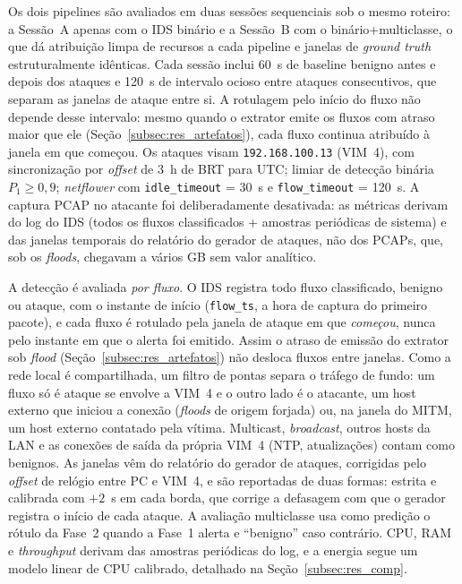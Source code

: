 \documentclass[12pt]{article}
\begin{document}
Os dois pipelines são avaliados em duas sessões
sequenciais sob o mesmo roteiro: a Sessão~A apenas com o IDS binário e a Sessão~B
com o binário+multiclasse, o que dá atribuição limpa de recursos a cada pipeline
e janelas de \textit{ground truth} estruturalmente idênticas. Cada sessão inclui
60~s de baseline benigno antes e depois dos ataques e 120~s de intervalo
ocioso entre ataques consecutivos, que separam as janelas de ataque entre si.
A rotulagem pelo início do fluxo não depende desse intervalo: mesmo quando o
extrator emite os fluxos com atraso maior que ele (Seção~\ref{subsec:res_artefatos}),
cada fluxo continua atribuído à janela em que começou. Os ataques visam \texttt{192.168.100.13}
(VIM~4), com sincronização por \textit{offset} de 3~h de BRT para UTC; limiar
de detecção binária $P_1 \geq 0{,}9$; \textit{netflower} com \texttt{idle\_timeout}
= 30~s e \texttt{flow\_timeout} = 120~s. A captura PCAP no atacante foi
deliberadamente desativada: as métricas derivam do log do IDS (todos os fluxos classificados + amostras
periódicas de sistema) e das janelas temporais do relatório do gerador de ataques, não
dos PCAPs, que, sob os \textit{floods}, chegavam a vários GB sem valor analítico.

A detecção é avaliada \emph{por fluxo}. O IDS registra todo fluxo classificado,
benigno ou ataque, com o instante de início (\texttt{flow\_ts}, a hora de captura
do primeiro pacote), e cada fluxo é rotulado pela janela de ataque em que
\emph{começou}, nunca pelo instante em que o alerta foi emitido. Assim o atraso
de emissão do extrator sob \textit{flood} (Seção~\ref{subsec:res_artefatos}) não
desloca fluxos entre janelas. Como a rede local é compartilhada, um filtro de
pontas separa o tráfego de fundo: um fluxo só é ataque se envolve a VIM~4 e o
outro lado é o atacante, um host externo que iniciou a conexão (\textit{floods}
de origem forjada) ou, na janela do MITM, um host externo contatado pela vítima.
Multicast, \textit{broadcast}, outros hosts da LAN e as conexões de saída da
própria VIM~4 (NTP, atualizações) contam como benignos. As janelas vêm do
relatório do gerador de ataques, corrigidas pelo \textit{offset} de relógio entre
PC e VIM~4, e são reportadas de duas formas: estrita e calibrada com $+2$~s em
cada borda, que corrige a defasagem com que o gerador registra o início de cada
ataque. A avaliação multiclasse usa como predição o rótulo da Fase~2 quando a
Fase~1 alerta e ``benigno'' caso contrário. CPU, RAM e \textit{throughput}
derivam das amostras periódicas do log, e a energia segue um modelo linear de CPU
calibrado, detalhado na Seção~\ref{subsec:res_comp}.
\end{document}
